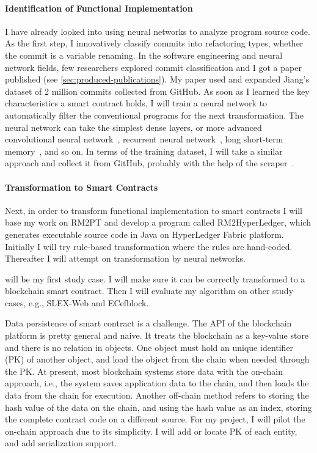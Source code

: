 \paragraph*{Identification of Functional Implementation}
I have already looked into using neural networks to analyze program source code.
As the first step, I innovatively classify commits into refactoring types, whether the commit is a variable renaming.
In the software engineering and neural network fields, few researchers explored commit classification and I got a paper published (see \autoref{sec:produced-publications}).
My paper used and expanded Jiang's dataset of 2 million commits collected from GitHub.
As soon as I learned the key characteristics a smart contract holds, I will train a neural network to automatically filter the conventional programs for the next transformation.
The neural network can take the simplest dense layers, or more advanced convolutional neural network~\cite{albawi2017understanding}, recurrent neural network~\cite{tarwani2017survey}, long short-term memory~\cite{skovajsova2017long}, and so on.
In terms of the training dataset, I will take a similar approach and collect it from GitHub, probably with the help of the scraper~\cite{alexandru2017replicating}.


\paragraph*{Transformation to Smart Contracts}
Next, in order to transform functional implementation to smart contracts
I will base my work on RM2PT and develop a program called RM2HyperLedger, which generates executable source code in Java on HyperLedger Fabric platform.
Initially I will try rule-based transformation where the rules are hand-coded. Thereafter I will attempt on transformation by neural networks.

{\cocome} will be my first study case. I will make sure it can be correctly transformed to a blockchain smart contract. Then I will evaluate my algorithm on other study cases, e.g., SLEX-Web and ECefblock.


Data persistence of smart contract is a challenge.
The API of the blockchain platform is pretty general and naive. It treats the blockchain as a key-value store and there is no relation in objects. One object must hold an unique identifier (PK) of another object, and load the object from the chain when needed through the PK.
At present, most blockchain systems store data with the on-chain approach, i.e., the system saves application data to the chain, and then loads the data from the chain for execution.
Another off-chain method refers to storing the hash value of the data on the chain, and using the hash value as an index, storing the complete contract code on a different source.
For my project, I will pilot the on-chain approach due to its simplicity. I will add or locate PK of each entity, and add serialization support.

